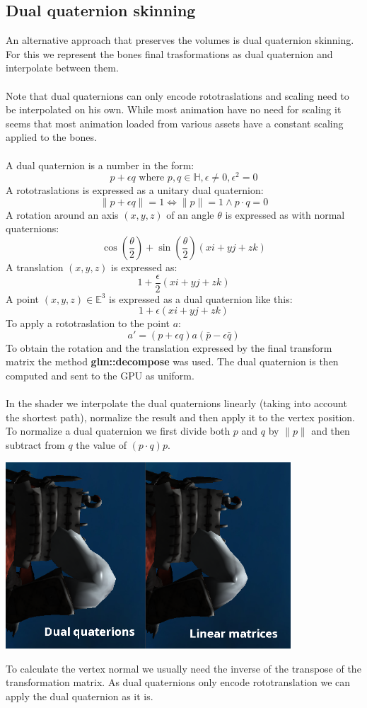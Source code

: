 \documentclass[12pt, a4paper]{article}
\begin{document}
\subsection{Dual quaternion skinning}
An alternative approach that preserves the volumes is dual quaternion skinning. For this we represent the bones final trasformations as dual quaternion
and interpolate between them.\\\\
Note that dual quaternions can only encode rototraslations and scaling need to be interpolated on his own. While most animation have no need for scaling
it seems that most animation loaded from various assets have a constant scaling applied to the bones.\\\\
A dual quaternion is a number in the form:
\[
    p + \epsilon q \text{ where } p, q \in \mathbb{H},
    \epsilon \neq 0, \epsilon^2 = 0
\]
A rototraslations is expressed as a unitary dual quaternion:
\[
    \|p + \epsilon q\| = 1 \iff \|p\| = 1 \land p \cdot q = 0
\]
A rotation around an axis $(x, y, z)$ of an angle $\theta$ is expressed as with normal quaternions:
\[
    \cos(\frac{\theta}{2})+\sin(\frac{\theta}{2})(xi + yj + zk)
\]
A translation $(x, y, z)$ is expressed as:
\[
    1+\frac{\epsilon}{2}(xi + yj + zk)
\]
A point $(x, y, z) \in \mathbb{E}^3$ is expressed as a dual quaternion like this:
\[
    1 + \epsilon (xi +  yj +  zk)
\]
To apply a rototraslation to the point $a$:
\[
    a' = (p + \epsilon q)a(\bar{p} - \epsilon \bar{q})
\]
To obtain the rotation and the translation expressed by the final transform matrix the method \textbf{glm::decompose} was used.
The dual quaternion is then computed and sent to the GPU as uniform.\\\\
In the shader we interpolate the dual quaternions linearly (taking into account the shortest path), normalize the result and then apply it to the vertex position.
To normalize a dual quaternion we first divide both $p$ and $q$ by $\|p\|$ and then subtract from $q$ the value of $(p \cdot q)p$.
\begin{center}
    \centering
    \includegraphics[width=0.8\textwidth]{img/dq.png}
\end{center}
To calculate the vertex normal we usually need the inverse of the transpose of the transformation matrix. As dual quaternions only encode rototranslation
we can apply the dual quaternion as it is.
\end{document}
